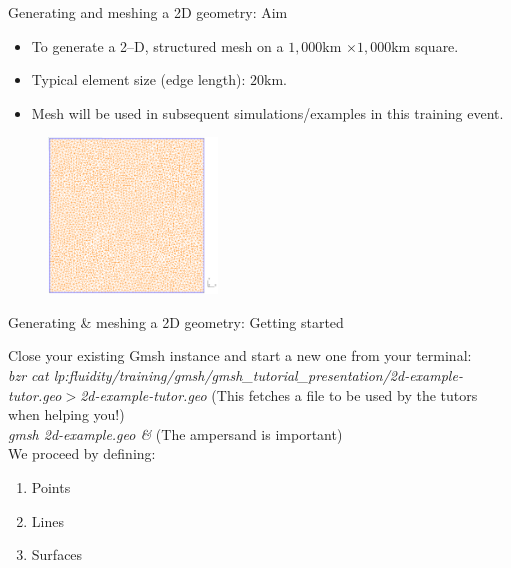 \documentclass[t]{beamer}
\begin{document}
\begin{frame}{Generating and meshing a 2D geometry: Aim}

\begin{itemize}
\item To generate a 2--D, structured mesh on a $1,000$km $\times 1,000$km square.
\item Typical element size (edge length): $20$km.
\item Mesh will be used in subsequent simulations/examples in this training event.
\end{itemize}

\begin{figure}[htbp]
 \centering
  \includegraphics[width=0.4\textwidth]{../figures/2d-example-mesh}
\end{figure}

\end{frame}


\begin{frame}{Generating \& meshing a 2D geometry: Getting started}

Close your existing Gmsh instance and start a new one from your terminal: \\[10pt]

\emph{bzr cat lp:fluidity/training/gmsh/gmsh\_tutorial\_presentation/2d-example-tutor.geo$>$2d-example-tutor.geo} (This fetches a file to be used by the tutors when helping you!)\\[10pt]
\emph{gmsh 2d-example.geo \&} (The ampersand is important)\\[10pt]

We proceed by defining:
\begin{enumerate}
\item Points
\item Lines
\item Surfaces
\end{enumerate}
\end{frame}
\end{document}
